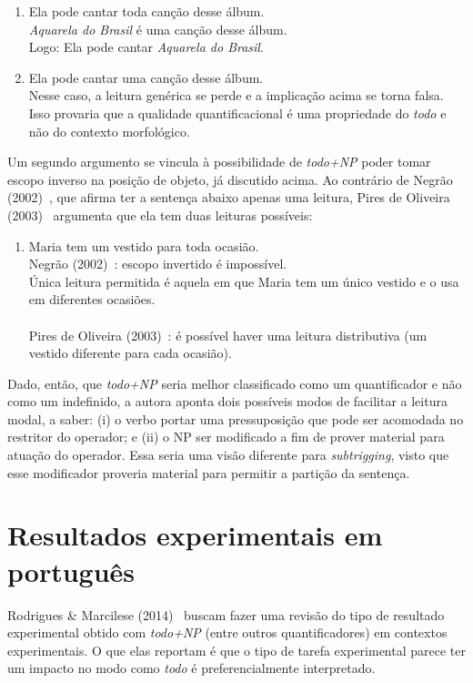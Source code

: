 \begin{enumerate}[resume]
    \item Ela pode cantar toda canção desse álbum. \\
    \emph{Aquarela do Brasil} é uma canção desse álbum. \\
    Logo: Ela pode cantar \emph{Aquarela do Brasil}.
    \item Ela pode cantar uma canção desse álbum. \\
    Nesse caso, a leitura genérica se perde e a implicação acima se torna falsa. \\
    Isso provaria que a qualidade quantificacional é uma propriedade do \emph{todo} e não do contexto morfológico.
\end{enumerate}

Um segundo argumento se vincula à possibilidade de \emph{todo+NP} poder tomar escopo inverso na posição de objeto, já discutido acima. Ao contrário de Negrão (2002)~\cite{neg2002}, que afirma ter a sentença abaixo apenas uma leitura, Pires de Oliveira (2003)~\cite{PiresOliv2003} argumenta que ela tem duas leituras possíveis:

\begin{enumerate}[resume]
    \item Maria tem um vestido para toda ocasião. \\
    Negrão (2002)~\cite{neg2002}: escopo invertido é impossível. \\
    Única leitura permitida é aquela em que Maria tem um único vestido e o usa em diferentes ocasiões.\\
    \\
    Pires de Oliveira (2003)~\cite{PiresOliv2003}: é possível haver uma leitura distributiva (um vestido diferente para cada ocasião).
\end{enumerate}

Dado, então, que \emph{todo+NP} seria melhor classificado como um quantificador e não como um indefinido, a autora aponta dois possíveis modos de facilitar a leitura modal, a saber: (i) o verbo portar uma pressuposição que pode ser acomodada no restritor do operador; e (ii) o NP ser modificado a fim de prover material para atuação do operador. Essa seria uma visão diferente para \emph{subtrigging}, visto que esse modificador proveria material para permitir a partição da sentença.

\section{Resultados experimentais em português}
Rodrigues \& Marcilese (2014)~\cite{RodMarc2014} buscam fazer uma revisão do tipo de resultado experimental obtido com \emph{todo+NP} (entre outros quantificadores) em contextos experimentais. O que elas reportam é que o tipo de tarefa experimental parece ter um impacto no modo como \emph{todo} é preferencialmente interpretado.

